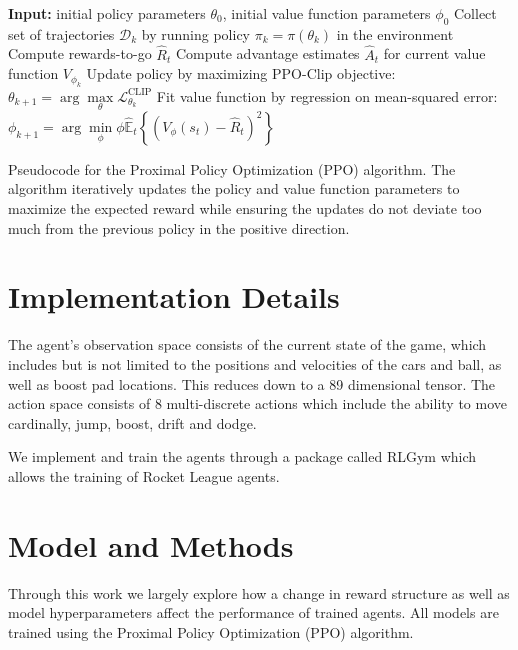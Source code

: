 \documentclass[conference]{IEEEtran}
\begin{document}
\begin{algorithm}
    \begin{algorithmic}[1]
        \State \textbf{Input:} initial policy parameters $\theta_0$, initial value function parameters $\phi_0$
        \State Collect set of trajectories $\mathcal{D}_k$ by running policy $\pi_k = \pi(\theta_k)$ in the environment
        \State Compute rewards-to-go $\hat{R}_t$ 
        \State Compute advantage estimates $\hat{A}_t$ for current value function $V_{\phi_k}$
        \State Update policy by maximizing PPO-Clip objective:
        \State \hspace{1cm} $\theta_{k+1} = \arg\underset{\theta}{\max} \mathcal{L}_{\theta_k}^{\text{CLIP}}$
        \State Fit value function by regression on mean-squared error:
        \State \hspace{1cm} $\phi_{k+1} = \arg\underset{\phi}{\min}{\phi} \hat{\mathbb{E}}_t\left\{ (V_{\phi}(s_t) - \hat{R}_t)^2 \right\}$
        \EndFor
    \end{algorithmic}
    \caption{Pseudocode for the Proximal Policy Optimization (PPO) algorithm. The algorithm iteratively updates the policy and value function parameters to maximize the expected reward while ensuring the updates do not deviate too much from the previous policy in the positive direction.}
    \label{alg:PPO}
\end{algorithm}

\section{Implementation Details}
 The agent's observation space consists of the current state of the game, which includes but is not limited to the positions and velocities of the cars and ball, as well as boost pad locations. This reduces down to a 89 dimensional tensor. The action space consists of 8 multi-discrete actions which include the ability to move cardinally, jump, boost, drift and dodge. 

 We implement and train the agents through a package called RLGym which allows the training of Rocket League agents.




\section{Model and Methods}
Through this work we largely explore how a change in reward structure as well as model hyperparameters affect the performance of trained agents. All models are trained using the Proximal Policy Optimization (PPO) algorithm.
\end{document}
